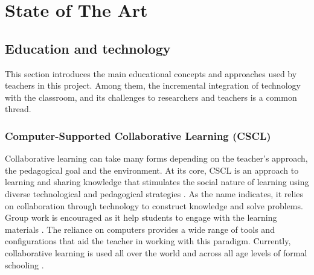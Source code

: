 \normallinespacing

\chapter{State of The Art}
\section{Education and technology} \label{soa_education}
This section introduces the main educational concepts and approaches used by teachers in this project. Among them, the incremental integration of technology with the classroom, and its challenges to researchers and teachers is a common thread.
\subsection{Computer-Supported Collaborative Learning (CSCL)}
Collaborative learning can take many forms depending on the teacher's approach, the pedagogical goal and the environment. At its core, CSCL is an approach to learning and sharing knowledge that stimulates the social nature of learning using diverse technological and pedagogical strategies \cite{Dillenbourg2009-jl}. As the name indicates, it relies on collaboration through technology to construct knowledge and solve problems. Group work is encouraged as it help students to engage with the learning materials \cite{Bonwell1991-sl}. The reliance on computers provides a wide range of tools and configurations that aid the teacher in working with this paradigm. Currently, collaborative learning is used all over the world and across all age levels of formal schooling \cite{Jeong2019-ul}.
